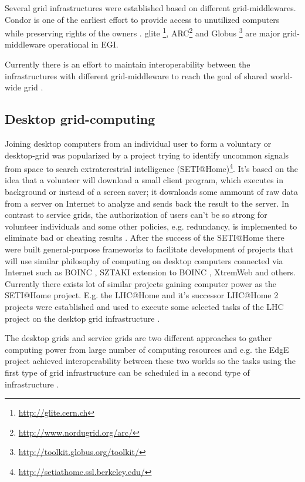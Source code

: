 Several grid infrastructures were established based on different grid-middlewares.
Condor is one of the earliest effort to provide access to unutilized computers while preserving rights of the owners \cite{Litzkow1990}. glite \cite{Laure2006}\footnote{\url{http://glite.cern.ch}}, ARC\footnote{\url{http://www.nordugrid.org/arc/}} and Globus \cite{Foster1997}\footnote{\url{http://toolkit.globus.org/toolkit/}} are major grid-middleware operational in EGI.

Currently there is an effort to maintain interoperability between the infrastructures with different grid-middleware to reach the goal of shared world-wide grid \cite{Riedel2009}.

\subsection{Desktop grid-computing}
\label{sec:desktopgrid}
Joining desktop computers from an individual user to form a voluntary or desktop-grid was popularized by a project trying to identify uncommon signals from space to search extraterestrial intelligence (SETI@Home)\footnote{\url{http://setiathome.ssl.berkeley.edu/}}. It's based on the idea that a volunteer will download a small client program, which executes in background or instead of a screen saver; it downloads some ammount of raw data from a server on Internet to analyze and sends back the result to the server. In contrast to service grids, the authorization of users can't be so strong for volunteer individuals and some other policies, e.g. redundancy, is implemented to eliminate bad or cheating results \cite{Anderson2002}. After the success of the SETI@Home there were built general-purpose frameworks to facilitate development of projects that will use similar philosophy of computing on desktop computers connected via Internet such as BOINC  \cite{Anderson2004}, SZTAKI extension to BOINC \cite{Balaton2007,Kacsuk2009}, XtremWeb \cite{Fedak2001} and others. Currently there exists lot of similar projects gaining computer power as the SETI@Home project. E.g. the LHC@Home and it's successor LHC@Home 2 projects were established and used to execute some selected tasks of the LHC project on the desktop grid infrastructure \cite{Herr2006,Hoimyr2012}.

The desktop grids and service grids are two different approaches to gather computing power from large number of computing resources and e.g. the EdgE project achieved interoperability between these two worlds so the tasks using the first type of grid infrastructure can be scheduled in a second type of infrastructure \cite{Kacsuk2008,Urbah2009}.

